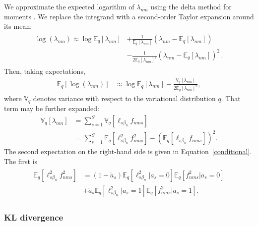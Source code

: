 We approximate the expected logarithm of $\lambda_{nm}$ using the delta method for moments \citep{bickel2015mathematical}.
We replace the integrand with a second-order Taylor expansion around its mean:
\begin{align}
\begin{split}
\log(\lambda_{nm})
\approx \log\mathbb{E}_{q}[\lambda_{nm}]
  &+\frac{1}{\mathbb{E}_{q}[\lambda_{nm}]}\left(\lambda_{nm} - \mathbb{E}_{q}[\lambda_{nm}]\right)\\
  &-\frac{1}{2\mathbb{E}_{q}[\lambda_{nm}]^{2}}\left(\lambda_{nm}-\mathbb{E}_{q}[\lambda_{nm}]\right)^{2}\,.
\end{split}
\end{align}
Then, taking expectations,
\begin{align}
\mathbb{E}_{q}[ \log(\lambda_{nm}) ]
&\approx \log\mathbb{E}_{q}[\lambda_{nm}]
  -\frac{\mathbb{V}_{q}[\lambda_{nm}]}{2\mathbb{E}_{q}[\lambda_{nm}]^{2}},
\end{align}
where $\mathbb V_q$ denotes variance with respect to the variational distribution $q$.
That term may be further expanded:
\begin{align}
\mathbb{V}_{q}[\lambda_{nm}] & =\sum_{s=1}^{S}\mathbb{V}_{q}\left[\ell_{s\beta_n}f_{nms}\right]\\
&=\sum_{s=1}^{S} \mathbb{E}_{q}\left[\ell_{s\beta_n}^{2}f_{nms}^{2}\right]
    - \left(\mathbb{E}_{q}\left[\ell_{s\beta_n}f_{nms}\right]\right)^{2}.
    \label{vareq}
\end{align}
The second expectation on the right-hand side is given in Equation~\ref{conditional}. The first is
\begin{align}
\begin{split}
\mathbb{E}_{q}\left[\ell_{s\beta_n}^{2}f_{nms}^{2}\right]
&= (1 - \acute a_s) \mathbb E_q \left[ \ell_{s\beta_n}^2 | a_s = 0 \right]\mathbb E_q \left[ f_{nms}^2 | a_s = 0 \right]\\
&+ \acute a_s \mathbb E_q \left[ \ell_{s\beta_n}^2 | a_s = 1 \right]\mathbb E_q \left[ f_{nms}^2 | a_s = 1 \right].
\end{split}
\end{align}


\subsubsection{KL divergence}

